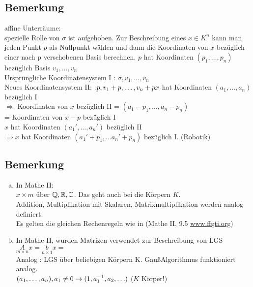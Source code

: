 \subsection{Bemerkung}
affine Unterräume:\\
spezielle Rolle von $\sigma$ ist aufgehoben. Zur Beschreibung eines $x \in K^n$ kann man jeden Punkt $p$ als \glqq Nullpunkt \grqq wählen  und dann die Koordinaten von $x$ bezüglich einer nach p \glqq verschobenen \grqq Basis berechnen. $p$ hat Koordinaten $(p_1,\ldots,p_n)$ bezüglich Basis $v_1,\ldots,v_n$\\
Ursprüngliche Koordinatensystem \textsc{I} : $\sigma,v_1,\ldots,v_n$\\
Neues Koordinatensystem \textsc{II}:
:$p,v_1+p,\ldots,v_{n} + p\\
x$ hat Koordinaten $(a_1,\ldots,a_n)$ bezüglich \textsc{I}\\
$\Rightarrow$ Koordinaten von $x$ bezüglich \textsc{II} = $(a_1 -p_1,\ldots,a_n -p_n)$\\
 = Koordinaten von $x-p$ bezüglich \textsc{I}\\
$x$ hat Koordinaten $(a_1',\ldots,a_n')$ bezüglich \textsc{II}\\
$\Rightarrow x$ hat Koordinaten $(a_1'+p_1,\ldots a_n'+p_n)$ bezüglich \textsc{I}. (Robotik)
\subsection{Bemerkung}
\begin{enumerate}[a)]
\item In Mathe II:\\
$x \times m$ über $\mathbb{Q},\mathbb{R},\mathbb{C}$. Das geht auch bei die Körpern $K$.\\
Addition, Multiplikation mit Skalaren, Matrixmultiplikation werden analog definiert.\\
Es gelten die gleichen Rechenregeln wie in (Mathe II, 9.5 \url{www.ffgti.org})
\item In Mathe II, wurden Matrizen verwendet zur Beschreibung von LGS $\underset{m \times n}{A} x = \underset{n \times 1}{b} x =$\\
Analog : LGS über beliebigen Körpern K.
Gau\ss Algorithmus funktioniert analog.\\
$(a_1,\ldots,a_n), a_1 \ne 0\\
\rightarrow (1,a_1^{-1},a_2,\ldots)\\
$\phantom{8} \hfill ($K$ Körper!)
\end{enumerate}
